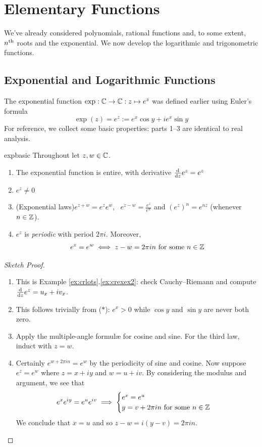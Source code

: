 \graphicspath{{3functions/asy/}}


\section{Elementary Functions}\label{chap:functions}

We've already considered polynomials, rational functions and, to some extent, $n\textsuperscript{th}$ roots and the exponential. We now develop the logarithmic and trigonometric functions.

\subsection{Exponential and Logarithmic Functions}%

The exponential function $\exp:\mathbb{C}\to\mathbb{C}:z\mapsto e^z$ was defined earlier using Euler's formula
\[
	\exp(z)=e^z:=e^x\cos y+ie^x\sin y \tag{$\ast$}
\]
For reference, we collect some basic properties: parts 1--3 are identical to real analysis.

\begin{lemm}{}{expbasic}
	Throughout let $z,w\in\mathbb{C}$.
	\begin{enumerate}\itemsep1pt
	  \item The exponential function is entire, with derivative $\frac{\mathrm{d} }{\mathrm{d} z}e^z=e^z$
	  \item $e^z\neq 0$
	  \item\label{lemmpart:exp4} (Exponential laws)\lstsp $e^{z+w}=e^{z}e^{w}$, \  $e^{z-w}=\frac{e^{z}}{e^{w}}$ and $(e^z)^n=e^{nz}$ (whenever $n\in\mathbb{Z}$).
	  \item\label{lemmpart:exp5} $e^z$ is \emph{periodic} with period $2\pi i$. Moreover,
	  \[
	  	e^z=e^w\iff z-w=2\pi in\text{ for some }n\in\mathbb{Z}
	  \]
	\end{enumerate}
\end{lemm}

\begin{proof}[Sketch Proof]
	\begin{enumerate}\itemsep1pt
	  \item This is Example \ref*{ex:crlots}.\ref{ex:crexex2}: check Cauchy--Riemann and compute $\frac{\mathrm{d} }{\mathrm{d} z}e^z=u_x+iv_x$.
	  \item This follows trivially from ($\ast$): $e^x>0$ while $\cos y$ and $\sin y$ are never both zero.
	  \item Apply the multiple-angle formulæ for cosine and sine. For the third law, induct with $z=w$.
		\item Certainly $e^{w+2\pi in}=e^w$ by the periodicity of sine and cosine. Now suppose $e^z=e^w$ where $z=x+iy$ and $w=u+iv$. By considering the modulus and argument, we see that
		\[
			e^xe^{iy}=e^ue^{iv}\implies
			\begin{cases}
				e^x=e^u\\
				y=v+2\pi in\text{ for some }n\in\mathbb{Z}
			\end{cases}
		\]
		We conclude that $x=u$ and so $z-w=i(y-v)=2\pi in$.\qedhere
	\end{enumerate}
\end{proof}

